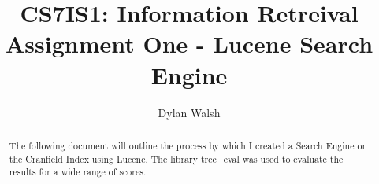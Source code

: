 \documentclass[acmtog, authorversion]{acmart}
\begin{document}
\title{CS7IS1: Information Retreival Assignment One - Lucene Search Engine}

\author{Dylan Walsh}


\begin{abstract}
The following document will outline the process by which I created a Search Engine on the Cranfield Index using Lucene. The library trec\_eval was used to evaluate the results for a wide range of scores. 
\end{abstract}

\maketitle


\end{document}
